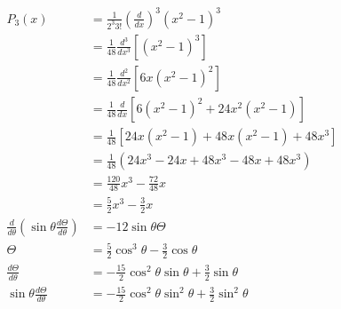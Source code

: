 \documentclass{article}
\begin{document}
\subsection{}

\begin{align*}
  P_3(x)                                                                  & = \frac{1}{2^3 3!} \left( \frac{d}{d x} \right)^3 (x^2 - 1)^3                        \\
                                                                          & = \frac{1}{48} \frac{d^3}{d x^3} \left[ (x^2 - 1)^3 \right]                          \\
                                                                          & = \frac{1}{48} \frac{d^2}{d x^2} \left[ 6 x (x^2 - 1)^2 \right]                      \\
                                                                          & = \frac{1}{48} \frac{d}{d x} \left[ 6 (x^2 - 1)^2 + 24 x^2 (x^2 - 1) \right]         \\
                                                                          & = \frac{1}{48} \left[ 24 x (x^2 - 1) + 48 x (x^2 - 1) + 48 x^3 \right]               \\
                                                                          & = \frac{1}{48} \left( 24 x^3 - 24 x + 48 x^3 - 48 x + 48 x^3 \right)                 \\
                                                                          & = \frac{120}{48} x^3 - \frac{72}{48} x                                               \\
                                                                          & = \frac{5}{2} x^3 - \frac{3}{2} x                                                    \\
  \frac{d}{d \theta} \left( \sin \theta \frac{d \Theta}{d \theta} \right) & = -12 \sin \theta \Theta                                                             \\
  \Theta                                                                  & = \frac{5}{2} \cos^3 \theta - \frac{3}{2} \cos \theta                                \\
  \frac{d \Theta}{d \theta}                                               & = -\frac{15}{2} \cos^2 \theta \sin \theta + \frac{3}{2} \sin \theta                  \\
  \sin \theta \frac{d \Theta}{d \theta}                                   & = -\frac{15}{2} \cos^2 \theta \sin^2 \theta + \frac{3}{2} \sin^2 \theta              \\

\end{align*}
\end{document}
